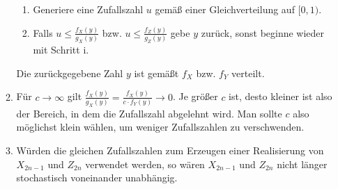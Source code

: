 \documentclass[a4paper]{scrartcl}
\def \blattnr {12}
\begin{document}
\begin{enumerate}[label=\bfseries \blattnr.\arabic*]
\begin{enumerate}
\begin{enumerate}
                    \item
                        Generiere eine Zufallszahl $u$ gemäß einer
                        Gleichverteilung auf $[0,1)$.

                    \item
                        Falls $u \leq \frac{f_X(y)}{g_X(y)}$ bzw. $u \leq
                        \frac{f_Z(y)}{g_Z(y)}$ gebe $y$ zurück, sonst beginne
                        wieder mit Schritt i.

                \end{enumerate}
                Die zurückgegebene Zahl $y$ ist gemäßt $f_X$ bzw. $f_Y$
                verteilt.

            \item
                Für $c \to \infty$ gilt $\frac{f_X(y)}{g_X(y)} =
                \frac{f_X(y)}{c \cdot f_Y(y)} \to 0$. Je größer $c$ ist, desto
                kleiner ist also der Bereich, in dem die Zufallszahl abgelehnt
                wird. Man sollte $c$ also möglichst klein wählen, um weniger
                Zufallszahlen zu verschwenden.

            \item
                Würden die gleichen Zufallszahlen zum Erzeugen einer
                Realisierung von $X_{2n-1}$ und $Z_{2n}$ verwendet werden, so
                wären $X_{2n-1}$ und $Z_{2n}$ nicht länger stochastisch
                voneinander unabhängig.

        \end{enumerate}

\end{enumerate}
\end{document}
